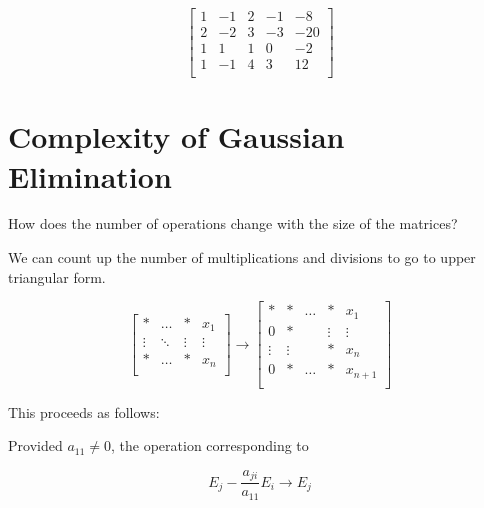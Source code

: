 \begin{equation*}
  \begin{bmatrix}
  1 & -1 & 2 & -1 & -8\\
  2 & -2 & 3 & -3 & -20\\
  1 & 1 & 1 & 0 & -2\\
  1 & -1 & 4 & 3 & 12\\
  \end{bmatrix}
\end{equation*}

\section{Complexity of Gaussian Elimination}

How does the number of operations change with the size of the matrices?

We can count up the number of multiplications and divisions to go to upper
triangular form.

\begin{equation*}
  \begin{bmatrix}
  * & \dots & * & x_1\\
  \vdots & \ddots & \vdots & \vdots\\
  * & \dots & * & x_n\\
  \end{bmatrix} 
  \to
  \begin{bmatrix}
   * & * & \dots & * & x_1\\
   0 & * &  & \vdots &  \vdots \\
   \vdots & \vdots & & * & x_n \\
   0 & * & \dots & * & x_{n+1} \\
  \end{bmatrix}
\end{equation*}

This proceeds as follows:

Provided $a_{11} \ne 0$, the operation corresponding to 

\begin{equation*}
  E_j - \frac{a_{ji}}{a_{11}} E_i \to E_j
\end{equation*}

